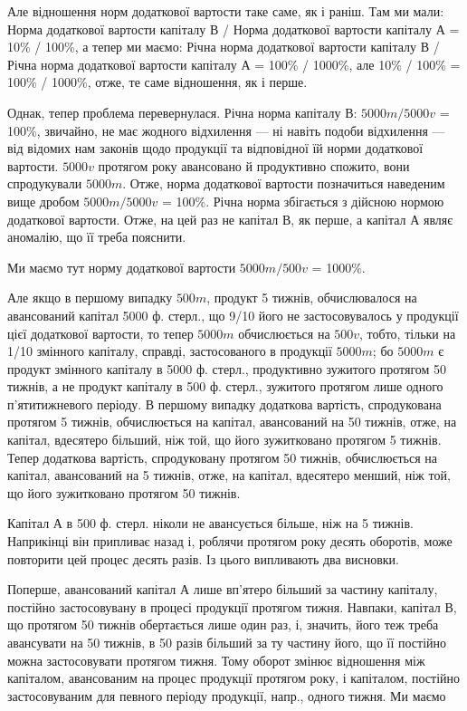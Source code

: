\parcont{}  %
Але відношення норм додаткової вартости таке саме, як і раніш. Там ми мали:
Норма додаткової вартости капіталу В / Норма додаткової вартости капіталу А =
10\% / 100\%, а тепер ми маємо:
Річна норма додаткової вартости капіталу В / Річна норма додаткової вартости капіталу А = 100\% /
1000\%, але 10\% / 100\% = 100\% / 1000\%, отже, те саме відношення, як і перше.

Однак, тепер проблема перевернулася. Річна норма капіталу В:
$5000m / 5000v$ = 100\%, звичайно, не має жодного відхилення — ні навіть
подоби відхилення — від відомих нам законів щодо продукції та відповідної
їй норми додаткової вартости. $5000v$ протягом року авансовано й
продуктивно спожито, вони спродукували $5000m$. Отже, норма додаткової
вартости позначиться наведеним вище дробом $5000m / 5000v$ = 100\%. Річна
норма збігається з дійсною нормою додаткової вартости. Отже, на цей
раз не капітал В, як перше, а капітал А являє аномалію, що її треба
пояснити.

Ми маємо тут норму додаткової вартости $5000m / 500v$ = 1000\%.

Але якщо в першому випадку $500m$, продукт 5 тижнів, обчислювалося
на авансований капітал 5000 ф. стерл., що 9/10 його не застосовувалось
у продукції цієї додаткової вартости, то тепер $5000m$ обчислюється на $500v$,
тобто, тільки на 1/10 змінного капіталу, справді, застосованого в продукції
$5000m$; бо $5000m$ є продукт змінного капіталу в 5000 ф. стерл., продуктивно
зужитого протягом 50 тижнів, а не продукт капіталу в 500 ф. стерл.,
зужитого протягом лише одного п’ятитижневого періоду. В першому випадку
додаткова вартість, спродукована протягом 5 тижнів, обчислюється
на капітал, авансований на 50 тижнів, отже, на капітал, вдесятеро більший,
ніж той, що його зужитковано протягом 5 тижнів. Тепер додаткова вартість,
спродуковану протягом 50 тижнів, обчислюється на капітал, авансований
на 5 тижнів, отже, на капітал, вдесятеро менший, ніж той, що
його зужитковано протягом 50 тижнів.

Капітал А в 500 ф. стерл. ніколи не авансується більше, ніж на 5 тижнів.
Наприкінці він припливає назад і, роблячи протягом року десять
оборотів, може повторити цей процес десять разів. Із цього випливають
два висновки.

Поперше, авансований капітал А лише вп’ятеро більший за частину
капіталу, постійно застосовувану в процесі продукції протягом
тижня. Навпаки, капітал В, що протягом 50 тижнів обертається лише
один раз, і, значить, його теж треба авансувати на 50 тижнів, в 50 разів
більший за ту частину його, що її постійно можна застосовувати протягом
тижня. Тому оборот змінює відношення між капіталом, авансованим
на процес продукції протягом року, і капіталом, постійно застосовуваним
для певного періоду продукції, напр., одного тижня. Ми маємо
\parbreak{}  %
